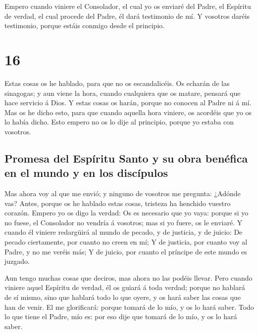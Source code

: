  Empero cuando viniere el Consolador, el cual yo os
enviaré del Padre, el Espíritu de verdad, el cual procede del Padre, él
dará testimonio de mí.  Y vosotros daréis testimonio,
porque estáis conmigo desde el principio.

\hypertarget{section-43-16}{%
\section{16}\label{section-43-16}}

 Estas cosas os he hablado, para que no os escandalicéis.
 Os echarán de las sinagogas; y aun viene la hora, cuando
cualquiera que os matare, pensará que hace servicio á Dios.
 Y estas cosas os harán, porque no conocen al Padre ni á
mí.  Mas os he dicho esto, para que cuando aquella hora
viniere, os acordéis que yo os lo había dicho. Esto empero no os lo dije
al principio, porque yo estaba con vosotros.

\hypertarget{promesa-del-espuxedritu-santo-y-su-obra-benuxe9fica-en-el-mundo-y-en-los-discuxedpulos}{%
\subsection{Promesa del Espíritu Santo y su obra benéfica en el mundo y
en los
discípulos}\label{promesa-del-espuxedritu-santo-y-su-obra-benuxe9fica-en-el-mundo-y-en-los-discuxedpulos}}

 Mas ahora voy al que me envió; y ninguno de vosotros me
pregunta: ¿Adónde vas?  Antes, porque os he hablado estas
cosas, tristeza ha henchido vuestro corazón.  Empero yo os
digo la verdad: Os es necesario que yo vaya: porque si yo no fuese, el
Consolador no vendría á vosotros; mas si yo fuere, os le enviaré.
 Y cuando él viniere redargüirá al mundo de pecado, y de
justicia, y de juicio:  De pecado ciertamente, por cuanto
no creen en mí;  Y de justicia, por cuanto voy al Padre,
y no me veréis más;  Y de juicio, por cuanto el príncipe
de este mundo es juzgado.

 Aun tengo muchas cosas que deciros, mas ahora no las
podéis llevar.  Pero cuando viniere aquel Espíritu de
verdad, él os guiará á toda verdad; porque no hablará de sí mismo, sino
que hablará todo lo que oyere, y os hará saber las cosas que han de
venir.  El me glorificará: porque tomará de lo mío, y os
lo hará saber.  Todo lo que tiene el Padre, mío es: por
eso dije que tomará de lo mío, y os lo hará saber.

